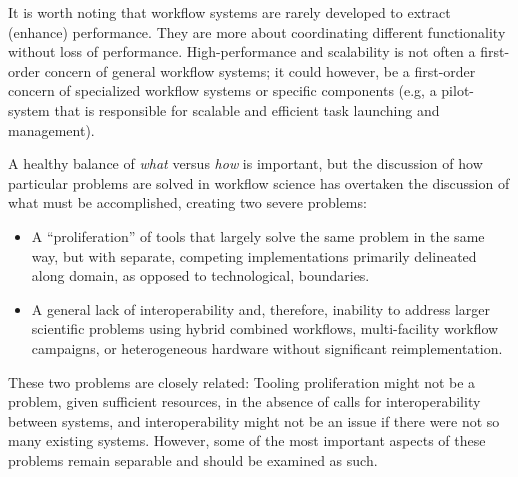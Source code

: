 It is worth noting that workflow systems are rarely developed to extract
(enhance) performance. They are more about coordinating different
functionality without loss of performance. High-performance and scalability is
not often a first-order concern of general workflow systems; it could however,
be a first-order concern of specialized workflow systems or specific
components (e.g, a pilot-system that is responsible for scalable and efficient
task launching and management).

A healthy balance of \textit{what} versus \textit{how} is
important, but the discussion of how particular problems are
solved in workflow science has overtaken the discussion of what must be
accomplished, creating two severe problems: 
\begin{itemize} 
  \item A ``proliferation'' of tools that largely solve the same problem in the
  same way, but with separate, competing implementations primarily delineated
  along domain, as opposed to technological, boundaries.  
  \item A general lack of interoperability and, therefore, inability to address
  larger scientific problems using hybrid combined workflows, multi-facility
  workflow campaigns, or heterogeneous hardware without significant
  reimplementation.
\end{itemize}

These two problems are closely related: Tooling proliferation might not be a
problem, given sufficient resources, in the absence of calls for
interoperability between systems, and interoperability might not be an issue if
there were not so many existing systems. However, some of the most important
aspects of these problems remain separable and should be examined as such.





